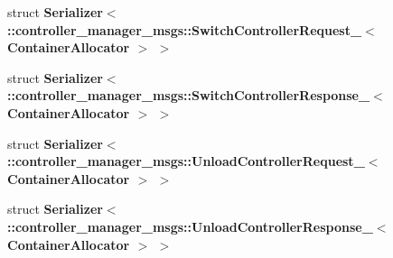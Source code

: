 \begin{DoxyCompactItemize}
\item 
struct {\bf \-Serializer$<$ \-::controller\-\_\-manager\-\_\-msgs\-::\-Switch\-Controller\-Request\-\_\-$<$ Container\-Allocator $>$ $>$}
\item 
struct {\bf \-Serializer$<$ \-::controller\-\_\-manager\-\_\-msgs\-::\-Switch\-Controller\-Response\-\_\-$<$ Container\-Allocator $>$ $>$}
\item 
struct {\bf \-Serializer$<$ \-::controller\-\_\-manager\-\_\-msgs\-::\-Unload\-Controller\-Request\-\_\-$<$ Container\-Allocator $>$ $>$}
\item 
struct {\bf \-Serializer$<$ \-::controller\-\_\-manager\-\_\-msgs\-::\-Unload\-Controller\-Response\-\_\-$<$ Container\-Allocator $>$ $>$}
\end{DoxyCompactItemize}
